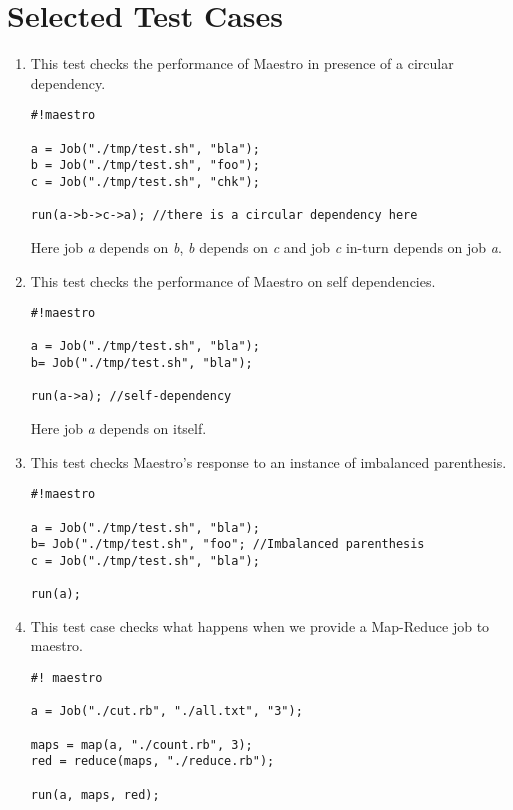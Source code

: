 \section{Selected Test Cases}
\begin{enumerate}

\item This test checks the performance of Maestro in presence of a circular dependency. 
\begin{verbatim}
#!maestro

a = Job("./tmp/test.sh", "bla");
b = Job("./tmp/test.sh", "foo");
c = Job("./tmp/test.sh", "chk");

run(a->b->c->a); //there is a circular dependency here
\end{verbatim}
Here job \textit{a} depends on \textit{b}, \textit{b} depends on \textit{c} and job \textit{c} in-turn depends on job \textit{a}.

\item This test checks the performance of Maestro on self dependencies.

\begin{verbatim}
#!maestro

a = Job("./tmp/test.sh", "bla");
b= Job("./tmp/test.sh", "bla");

run(a->a); //self-dependency
\end{verbatim}

Here job \textit{a} depends on itself.
\newpage
\noindent \item This test checks Maestro's response to an instance of imbalanced parenthesis.

\begin{verbatim}
#!maestro

a = Job("./tmp/test.sh", "bla");
b= Job("./tmp/test.sh", "foo"; //Imbalanced parenthesis
c = Job("./tmp/test.sh", "bla");

run(a);
\end{verbatim}

\item This test case checks what happens when we provide a Map-Reduce job to maestro.

\begin{verbatim}
#! maestro

a = Job("./cut.rb", "./all.txt", "3");

maps = map(a, "./count.rb", 3);
red = reduce(maps, "./reduce.rb");

run(a, maps, red);
\end{verbatim}

\end{enumerate}

